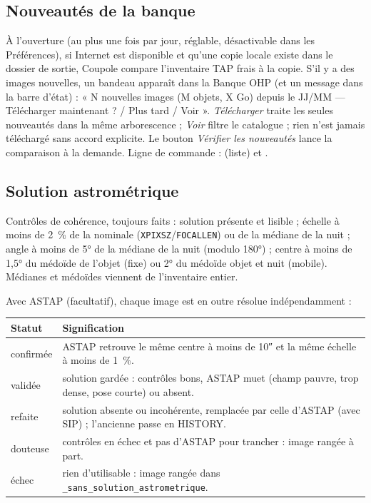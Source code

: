 \subsection{Nouveautés de la banque}\label{sec:nouveautes}
À l'ouverture (au plus une fois par jour, réglable, désactivable dans les Préférences), si Internet est disponible et
qu'une copie locale existe dans le dossier de sortie, Coupole compare l'inventaire TAP frais à la copie. S'il y a des
images nouvelles, un bandeau apparaît dans la Banque OHP (et un message dans la barre d'état) : « N nouvelles images
(M objets, X Go) depuis le JJ/MM --- Télécharger maintenant ? / Plus tard / Voir ». \emph{Télécharger} traite les
seules nouveautés dans la même arborescence ; \emph{Voir} filtre le catalogue ; rien n'est jamais téléchargé sans
accord explicite. Le bouton \emph{Vérifier les nouveautés} lance la comparaison à la demande. Ligne de commande :
 (liste) et .

\subsection{Solution astrométrique}\label{sec:astrometrie}
Contrôles de cohérence, toujours faits : solution présente et lisible ; échelle à moins de 2~\% de la nominale
(\texttt{XPIXSZ}/\texttt{FOCALLEN}) ou de la médiane de la nuit ; angle à moins de 5° de la médiane de la nuit
(modulo 180°) ; centre à moins de 1,5° du médoïde de l'objet (fixe) ou 2° du médoïde objet et nuit (mobile).
Médianes et médoïdes viennent de l'inventaire entier.

Avec ASTAP (facultatif), chaque image est en outre résolue indépendamment :
\begin{center}\small
\begin{tabularx}{\linewidth}{@{}lX@{}}
\toprule
\textbf{Statut} & \textbf{Signification}\\
\midrule
confirmée & ASTAP retrouve le même centre à moins de 10″ et la même échelle à moins de 1~\%.\\
validée & solution gardée : contrôles bons, ASTAP muet (champ pauvre, trop dense, pose courte) ou absent.\\
refaite & solution absente ou incohérente, remplacée par celle d'ASTAP (avec SIP) ; l'ancienne passe en HISTORY.\\
douteuse & contrôles en échec et pas d'ASTAP pour trancher : image rangée à part.\\
échec & rien d'utilisable : image rangée dans \texttt{\_sans\_solution\_astrometrique}.\\
\bottomrule
\end{tabularx}
\end{center}

